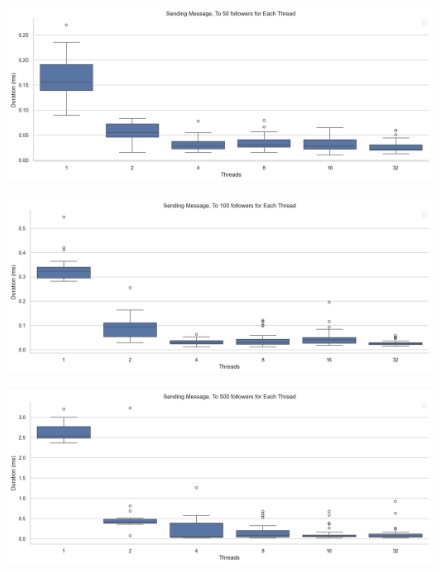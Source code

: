 \documentclass[a4paper]{article}
\begin{document}
\begin{figure}[H]
	\centering
	\includegraphics[width = \linewidth]{Images/SendingMessageBox50Followers.png}
	\caption{}
\end{figure}
\begin{figure}[H]
	\centering
	\includegraphics[width = \linewidth]{Images/SendingMessageBox100Follower.png}
	\caption{}
\end{figure}
\begin{figure}[H]
	\centering
	\includegraphics[width = \linewidth]{Images/SendingMessageBox500Follower.png}
	\caption{}
\end{figure}
\end{document}
